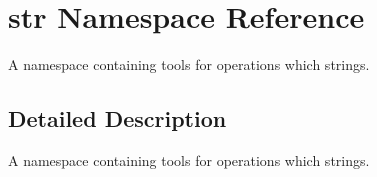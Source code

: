 \hypertarget{namespacestr}{\section{str Namespace Reference}
\label{namespacestr}
}


A namespace containing tools for operations which strings.  




\subsection{Detailed Description}
A namespace containing tools for operations which strings. 